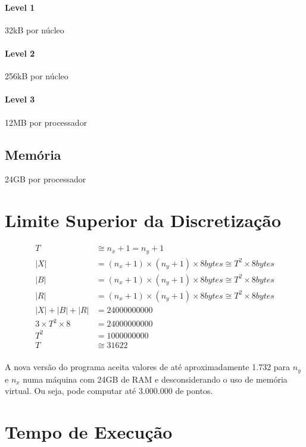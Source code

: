 \documentclass[12pt]{article}
\begin{document}
\paragraph{Level 1} 32kB por núcleo
\paragraph{Level 2} 256kB por núcleo
\paragraph{Level 3} 12MB por processador

\subsection{Memória}
24GB por processador

\newpage

\section{Limite Superior da Discretização}

\begin{align}
	T &\cong n_x + 1 = n_y + 1 \\
	|X| &= (n_x+1)\times(n_y+1)\times8 bytes \cong T^2\times8 bytes \\
	|B| &= (n_x+1)\times(n_y+1)\times8 bytes \cong T^2\times8 bytes \\
	|R| &= (n_x+1)\times(n_y+1)\times8 bytes \cong T^2\times8 bytes \\
	|X| + |B| + |R| &= 24000000000 \\
	3\times T^2\times8 &= 24000000000 \\
	T^2 &= 1000000000\\
	T &\cong 31622
\end{align}

\paragraph{}
A nova versão do programa aceita valores de até aproximadamente 1.732 para $n_y$ e $n_x$ numa máquina com 24GB de RAM e desconsiderando o uso de memória virtual.
Ou seja, pode computar até 3.000.000 de pontos.

\newpage

\section{Tempo de Execução}
\end{document}
